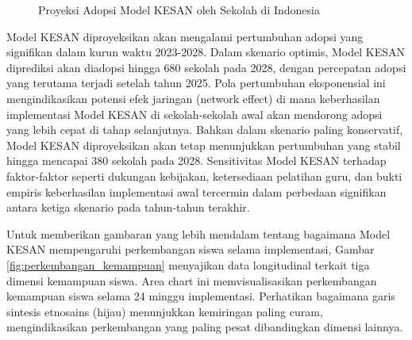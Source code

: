 \documentclass[12pt,a4paper,oneside]{book}
\begin{document}
\begin{figure}[H]
  \centering
  \caption{Proyeksi Adopsi Model KESAN oleh Sekolah di Indonesia}
  \label{fig:proyeksi_adopsi}
\end{figure}

Model KESAN diproyeksikan akan mengalami pertumbuhan adopsi yang signifikan dalam kurun waktu 2023-2028. Dalam skenario optimis, Model KESAN diprediksi akan diadopsi hingga 680 sekolah pada 2028, dengan percepatan adopsi yang terutama terjadi setelah tahun 2025. Pola pertumbuhan eksponensial ini mengindikasikan potensi efek jaringan (network effect) di mana keberhasilan implementasi Model KESAN di sekolah-sekolah awal akan mendorong adopsi yang lebih cepat di tahap selanjutnya. Bahkan dalam skenario paling konservatif, Model KESAN diproyeksikan akan tetap menunjukkan pertumbuhan yang stabil hingga mencapai 380 sekolah pada 2028. Sensitivitas Model KESAN terhadap faktor-faktor seperti dukungan kebijakan, ketersediaan pelatihan guru, dan bukti empiris keberhasilan implementasi awal tercermin dalam perbedaan signifikan antara ketiga skenario pada tahun-tahun terakhir.

Untuk memberikan gambaran yang lebih mendalam tentang bagaimana Model KESAN mempengaruhi perkembangan siswa selama implementasi, Gambar \ref{fig:perkembangan_kemampuan} menyajikan data longitudinal terkait tiga dimensi kemampuan siswa. Area chart ini memvisualisasikan perkembangan kemampuan siswa selama 24 minggu implementasi. Perhatikan bagaimana garis sintesis etnosains (hijau) menunjukkan kemiringan paling curam, mengindikasikan perkembangan yang paling pesat dibandingkan dimensi lainnya.
\end{document}
